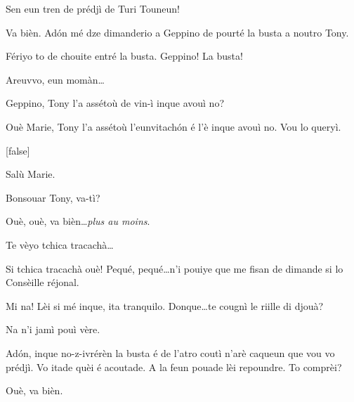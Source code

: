 \begin{drama}
\Twitterspeaks{} Sen eun tren de prédjì de Turi Touneun!

\Mariespeaks Va bièn. Ad\'on mé dze dimanderio a Geppino de pourté la busta a noutro Tony.




\Mariespeaks Fériyo to de chouite entré la busta.  Geppino! La busta!

\Geppinospeaks Areuvvo, eun momàn\ldots


\Mariespeaks Geppino, Tony l’a assétoù de vin-ì inque avouì no?

\Geppinospeaks Ouè Marie, Tony l’a assétoù l'eunvitach\'on é l’è inque avouì no. Vou lo queryì.

[false]%


\Turispeaks Salù Marie.

\Mariespeaks Bonsouar Tony, va-tì?

\Turispeaks{} Ouè, ouè, va bièn\ldots \textit{plus au moins}. 

\Mariespeaks Te vèyo tchica tracachà\ldots

\Turispeaks Si tchica tracachà ouè! Pequé, pequé\ldots n’i pouiye que me fisan de dimande si lo Consèille réjonal.

\Mariespeaks Mi na! Lèi si mé inque, ita tranquilo. Donque\ldots te cougnì le riille di djouà?

\Turispeaks Na n'i jamì pouì vère.

\Mariespeaks Ad\'on, inque  no-z-ivrérèn  la busta é de l'atro coutì n'arè caqueun que vou vo prédjì. Vo itade quèi é acoutade. A la feun pouade lèi repoundre. To comprèi?

\Turispeaks Ouè, va bièn.


\end{drama}
